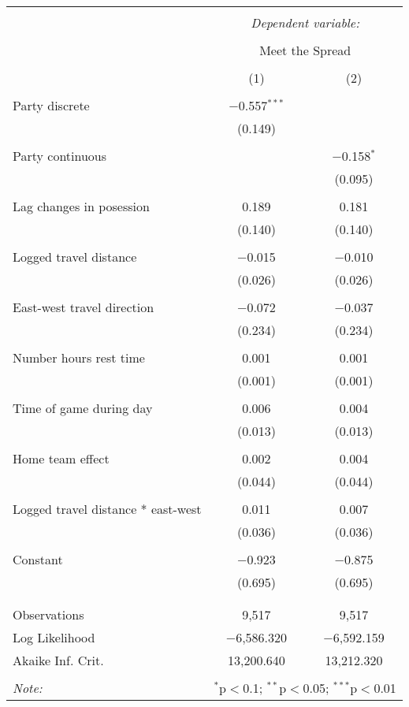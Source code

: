 \documentclass[letterpaper,12pt]{article}
\begin{document}
\begin{tabular}{@{\extracolsep{5pt}}lcc}  \\[-1.8ex]\hline  \hline \\[-1.8ex]   & \multicolumn{2}{c}{\textit{Dependent variable:}} \\  \cline{2-3}  \\[-1.8ex] & \multicolumn{2}{c}{Meet the Spread} \\  \\[-1.8ex] & (1) & (2)\\  \hline \\[-1.8ex]   Party discrete & $-$0.557$^{***}$ &  \\    & (0.149) &  \\    & & \\   Party continuous &  & $-$0.158$^{*}$ \\    &  & (0.095) \\    & & \\   Lag changes in posession & 0.189 & 0.181 \\    & (0.140) & (0.140) \\    & & \\   Logged travel distance & $-$0.015 & $-$0.010 \\    & (0.026) & (0.026) \\    & & \\   East-west travel direction & $-$0.072 & $-$0.037 \\    & (0.234) & (0.234) \\    & & \\   Number hours rest time & 0.001 & 0.001 \\    & (0.001) & (0.001) \\    & & \\   Time of game during day & 0.006 & 0.004 \\    & (0.013) & (0.013) \\    & & \\   Home team effect & 0.002 & 0.004 \\    & (0.044) & (0.044) \\    & & \\   Logged travel distance * east-west & 0.011 & 0.007 \\    & (0.036) & (0.036) \\    & & \\   Constant & $-$0.923 & $-$0.875 \\    & (0.695) & (0.695) \\    & & \\  \hline \\[-1.8ex]  Observations & 9,517 & 9,517 \\  Log Likelihood & $-$6,586.320 & $-$6,592.159 \\  Akaike Inf. Crit. & 13,200.640 & 13,212.320 \\  \hline  \hline \\[-1.8ex]  \textit{Note:}  & \multicolumn{2}{r}{$^{*}$p$<$0.1; $^{**}$p$<$0.05; $^{***}$p$<$0.01} \\  \end{tabular}  
\end{document}
